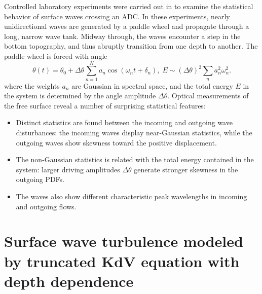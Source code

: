 \documentclass[9pt,twocolumn,twoside,lineno]{pnas-new}
\begin{document}
Controlled laboratory experiments were carried out in  \cite{bolles2018anomalous} to examine the statistical behavior of surface waves crossing an ADC. In these experiments, nearly unidirectional waves are generated by a paddle wheel and propagate through a long, narrow wave tank. Midway through, the waves encounter a step in the bottom topography, and thus abruptly transition from one depth to another. The paddle wheel is forced with angle
\[
\theta\left(t\right)=\theta_{0}+\Delta\theta\sum_{n=1}^{N}a_{n}\cos\left(\omega_{n}t+\delta_{n}\right),\;E\sim\left(\Delta\theta\right)^{2}\sum_{n}a_{n}^{2}\omega_{n}^{2}.
\]
where the weights $a_n$ are Gaussian in spectral space, and
the total energy $E$ in the system is determined by the angle amplitude
$\Delta\theta$. Optical measurements of the free surface reveal a number of surprising statistical features:
\begin{itemize}
\item Distinct statistics are found between the incoming and outgoing wave
disturbances: the incoming waves display near-Gaussian statistics,
while the outgoing waves show skewness toward the positive displacement.
\item The non-Gaussian statistics is related with the total energy contained
in the system: larger driving amplitudes $\Delta\theta$ generate
stronger skewness in the outgoing PDFs.
\item The waves also show different characteristic peak wavelengths in incoming
and outgoing flows.


\end{itemize}

\section{Surface wave turbulence modeled by truncated KdV equation with depth dependence\label{sec:Surface-wave-turbulence}}
\end{document}
